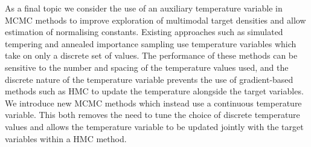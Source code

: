 As a final topic we consider the use of an auxiliary temperature variable in MCMC methods to improve exploration of multimodal target densities and allow estimation of normalising constants. Existing approaches such as simulated tempering and annealed importance sampling use temperature variables which take on only a discrete set of values. The performance of these methods can be sensitive to the number and spacing of the temperature values used, and the discrete nature of the temperature variable prevents the use of gradient-based methods such as HMC to update the temperature alongside the target variables. We introduce new MCMC methods which instead use a continuous temperature variable. This both removes the need to tune the choice of discrete temperature values and allows the temperature variable to be updated jointly with the target variables within a HMC method. 



